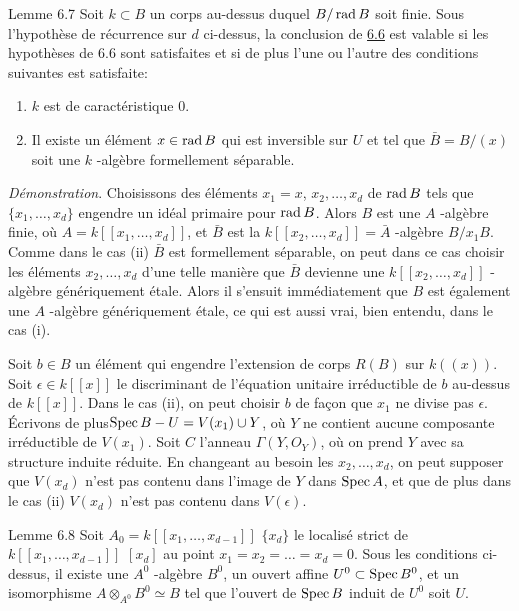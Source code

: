\documentclass[10pt]{../fichiers-configuration-latex/smfart}
\begin{document}
\begin{enonce*}{Lemme 6.7}
Soit $k\subset B$ un corps au-dessus duquel $B/\operatorname{rad} B$ soit
finie. Sous l'hypothèse de récurrence sur $d$ ci-dessus, la conclusion
de \hyperref[XIX.lem6.6]{6.6} est valable si les hypothèses de $6.6$ sont satisfaites et si
de plus l'une ou l'autre des conditions suivantes est satisfaite:
\begin{enumerate}
\renewcommand{\theenumi}{\roman{enumi}}
\renewcommand{\labelenumi}{(\theenumi)}
\item $k$ est de caractéristique $0$.

\item Il existe un élément $x\in \operatorname{rad} B$ qui est inversible sur $U$ et
tel que $\bar{B}=B/(x)$ soit une $k$ -algèbre formellement séparable.
\end{enumerate}
\end{enonce*}

\medskip
\noindent
\emph{Démonstration}. Choisissons des éléments $x_{1}=x$,
$x_{2},\ldots, x_{d}$ de $\operatorname{rad} B$ tels que $\{x_{1},\ldots,x_{d}\}$
engendre un idéal primaire pour $\operatorname{rad} B$. Alors $B$ est une $A$
-algèbre finie, où $A=k[[x_{1},\ldots,x_{d}]]$, et $\bar{B}$ est la
$k[[x_{2},\ldots, x_{d}]]=\bar{A}$ -algèbre $B/x_{1}B$. Comme dans le
cas (ii) $\bar{B}$ est formellement séparable, on peut dans ce cas
choisir les éléments $x_{2},\ldots,x_{d}$ d'une telle manière que
$\bar{B}$ devienne une $k[[x_{2},\ldots,x_{d}]]$ - algèbre
génériquement étale. Alors il s'ensuit immédiatement que $B$ est
également une $A$ -algèbre génériquement étale, ce qui est aussi vrai,
bien entendu, dans le cas (i).

Soit $b\in B$ un élément qui engendre l'extension de corps $R(B)$ sur
$k((x))$. Soit $\epsilon \in k[[x]]$ le discriminant de l'équation
unitaire irréductible de $b$ au-dessus de $k[[x]]$. Dans le cas (ii),
on peut choisir $b$ de façon que $x_{1}$ ne divise pas
$\epsilon$. Écrivons de plus\pageoriginale $\operatorname{Spec} B-U=V(x_{1})\cup Y$,
où $Y$ ne contient aucune composante irréductible de $V(x_{1})$. Soit
$C$ l'anneau $\Gamma(Y,O_{Y})$, où on prend $Y$ avec sa structure
induite réduite. En changeant au besoin les $x_{2},\ldots,x_{d}$, on
peut supposer que $V(x_{d})$ n'est pas contenu dans l'image de $Y$
dans $\operatorname{Spec} A$, et que de plus dans le cas (ii) $V(x_{d})$ n'est pas
contenu dans $V(\epsilon)$.

\begin{enonce*}{Lemme 6.8}
Soit $A_{0}=k[[x_{1},\ldots,x_{d-1}]]$ $\{x_{d}\}$ le localisé strict
de $k[[x_{1},\ldots,x_{d-1}]]$ $[x_{d}]$ au point
$x_{1}=x_{2}=\ldots=x_{d}=0$. Sous les conditions ci-dessus, il existe
une $A^{0}$ -algèbre $B^{0}$, un ouvert affine $U^{0}\subset \operatorname{Spec}
B^{0}$, et un isomorphisme $A\otimes_{A^{0}}B^{0}\simeq B$ tel que
l'ouvert de $\operatorname{Spec} B$ induit de $U^{0}$ soit $U$.
\end{enonce*}
\end{document}
